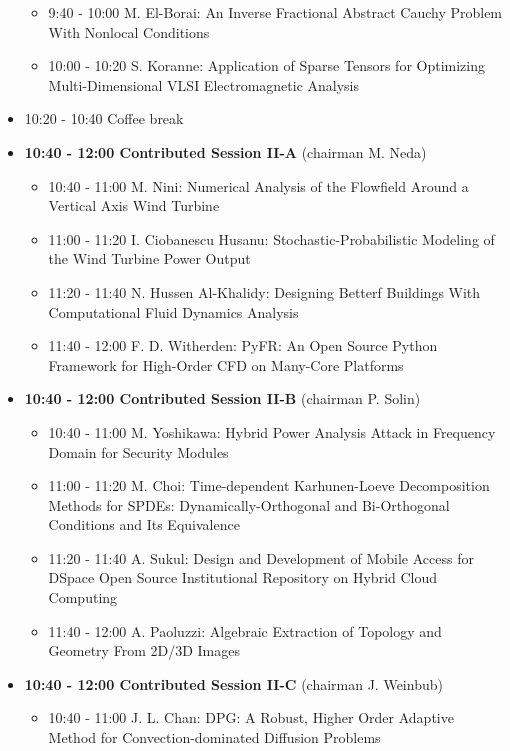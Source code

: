 \documentclass[10pt, A4]{article}%
\begin{document}
\begin{itemize}
\begin{itemize}
    \item 9:40 - 10:00 {M. El-Borai}: {An Inverse Fractional Abstract Cauchy Problem With Nonlocal Conditions} 
    \item 10:00 - 10:20 {S. Koranne}: {Application of Sparse Tensors for Optimizing Multi-Dimensional VLSI Electromagnetic Analysis}
  \end{itemize}
  \item 10:20 - 10:40 Coffee break
  \item {\bf 10:40 - 12:00 Contributed Session II-A} (chairman M. Neda) 
  \begin{itemize}
    \item 10:40 - 11:00 {M. Nini}: {Numerical Analysis of the Flowfield Around a Vertical Axis Wind Turbine}
    \item 11:00 - 11:20 {I. Ciobanescu Husanu}: {Stochastic-Probabilistic Modeling of the Wind Turbine Power Output}
    \item 11:20 - 11:40 {N. Hussen Al-Khalidy}: {Designing Betterf Buildings With Computational Fluid Dynamics Analysis}
    \item 11:40 - 12:00 {F. D. Witherden}: {PyFR: An Open Source Python Framework for High-Order CFD on Many-Core Platforms}
  \end{itemize}
  \item {\bf 10:40 - 12:00 Contributed Session II-B} (chairman P. Solin) 
  \begin{itemize}
    \item 10:40 - 11:00 {M. Yoshikawa}: {Hybrid Power Analysis Attack in Frequency Domain for Security Modules}
    \item 11:00 - 11:20 {M. Choi}: {Time-dependent Karhunen-Loeve Decomposition Methods for SPDEs: Dynamically-Orthogonal and Bi-Orthogonal Conditions and Its Equivalence}
    \item 11:20 - 11:40 {A. Sukul}: {Design and Development of Mobile Access for DSpace Open Source Institutional Repository on Hybrid Cloud Computing} %
    \item 11:40 - 12:00 {A. Paoluzzi}: {Algebraic Extraction of Topology and Geometry From 2D/3D Images}
    \end{itemize}
    \newpage
  \item {\bf 10:40 - 12:00 Contributed Session II-C} (chairman J. Weinbub) 
  \begin{itemize}
    \item 10:40 - 11:00 {J. L. Chan}: {DPG: A Robust, Higher Order Adaptive Method for Convection-dominated Diffusion Problems}

\end{itemize}
\end{itemize}
\end{document}
